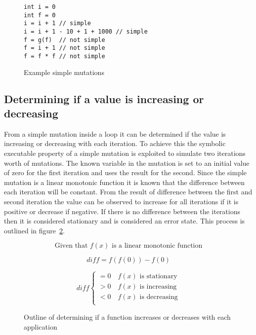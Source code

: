 \begin{figure}[ht]
\begin{lstlisting}
int i = 0
int f = 0
i = i + 1 // simple
i = i + 1 - 10 + 1 + 1000 // simple
f = g(f)  // not simple
f = i + 1 // not simple
f = f * f // not simple
\end{lstlisting}
\caption{Example simple mutations}
\label{lst:simple-mutations}
\end{figure}

\subsection{Determining if a value is increasing or decreasing}\label{s:sequence-dir}


From a simple mutation inside a loop it can be determined if the value is
increasing or decreasing with each iteration.
To achieve this the symbolic executable property of a simple mutation is
exploited to simulate two iterations worth of mutations.
The known variable in the mutation is set to an initial value of zero for
the first iteration and uses the result for the second.
Since the simple mutation is a linear monotonic function it is known that
the difference between each iteration will be constant.
From the result of difference between the first and second iteration the
value can be observed to increase for all iterations if it is positive or
decrease if negative. If there is no difference between the iterations then
it is considered stationary and is considered an error state.
This process is outlined in figure~\ref{math:simple-mutation}.

\begin{figure}
    $$\text{Given that } f(x) \text{ is a linear monotonic function}$$

    $$diff = f(f(0)) - f(0)$$

    \[
        diff \begin{cases}
            = 0 \quad f(x) \text{ is stationary}\\
            > 0 \quad f(x) \text{ is increasing}\\
            < 0 \quad f(x) \text{ is decreasing}\\
        \end{cases}
    \]
    \caption{Outline of determining if a function increases or decreases with
    each application}
\label{math:simple-mutation}
\end{figure}

